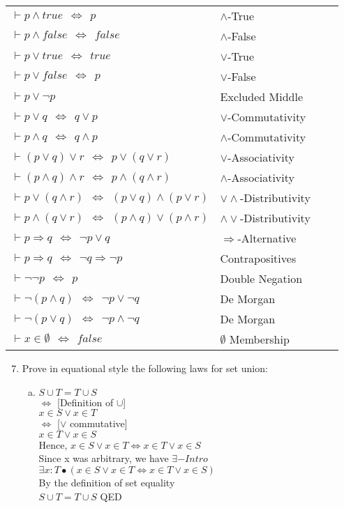 \documentclass{article}
\renewcommand{\implies}{\Rightarrow}
\renewcommand{\iff}{\Leftrightarrow}
\begin{document}
\begin{enumerate}[\bf I.]
\begin{tabular}{llll}
$\vdash p \land \mathit{true} ~~\iff~~ p$   &$\land$-True\\
$\vdash p \land \mathit{false} ~~\iff~~ \mathit{false}$
&$\land$-False\\
$\vdash p \lor \mathit{true} ~~\iff~~ \mathit{true}$ &$\lor$-True\\
$\vdash p \lor \mathit{false} ~~\iff~~ p$ & $\lor$-False\\
$\vdash p \lor \neg p$  &Excluded Middle\\
$\vdash p \lor q ~~\iff~~ q \lor p$ & $\lor$-Commutativity\\
$\vdash p \land q ~~\iff~~ q \land p$ &$\land$-Commutativity\\
$\vdash (p \lor q) \lor r ~~\iff~~ p \lor (q \lor r)$ &$\lor$-Associativity\\
$\vdash (p \land q) \land r ~~\iff~~ p \land (q \land r)$
&$\land$-Associativity\\
$\vdash p \lor (q \land r) ~~\iff~~ (p \lor q) \land (p \lor r)$
&$\lor\land$-Distributivity\\
$\vdash p \land (q \lor r) ~~\iff~~ (p \land q) \lor (p \land r)$
&$\land\lor$-Distributivity\\
$\vdash p \implies q ~~\iff~~ \neg p \lor q$ &$\implies$-Alternative\\
$\vdash p \implies q ~~\iff~~ \neg q \implies \neg p$
&Contrapositives\\
$\vdash \neg\neg p ~~\iff~~ p$   &Double Negation\\
$\vdash \neg(p \land q) ~~\iff~~ \neg p \lor \neg q$&De Morgan\\
$\vdash \neg(p \lor q) ~~\iff~~ \neg p \land \neg q$& De Morgan\\
$\vdash x\in\emptyset ~~\iff~~ \mathit{false}$& $\emptyset$ Membership\\
\end{tabular}
\begin{enumerate}[1.]\setcounter{enumii}{6}
\item Prove in equational style the following laws for set union:

\begin{enumerate}[a.]
\item $S\cup T=T\cup S$ \\
  $\iff$ [Definition of $\cup$] \\
  $x \in S \lor x \in T $ \\
  $\iff$ [$\lor$ commutative]\\
  $ x \in T \lor x \in S $ \\
  Hence, $ x \in S \lor x \in T \iff x \in T \lor x \in S $ \\
  Since x was arbitrary, we have $\exists-Intro$ \\
  $\exists x:T \bullet (x \in S \lor x \in T \iff x \in T \lor x \in S )$ \\
  By the definition of set equality \\
  $ S \cup T= T\cup S$ QED \\
  

\end{enumerate}
\end{enumerate}
\end{enumerate}
\end{document}
